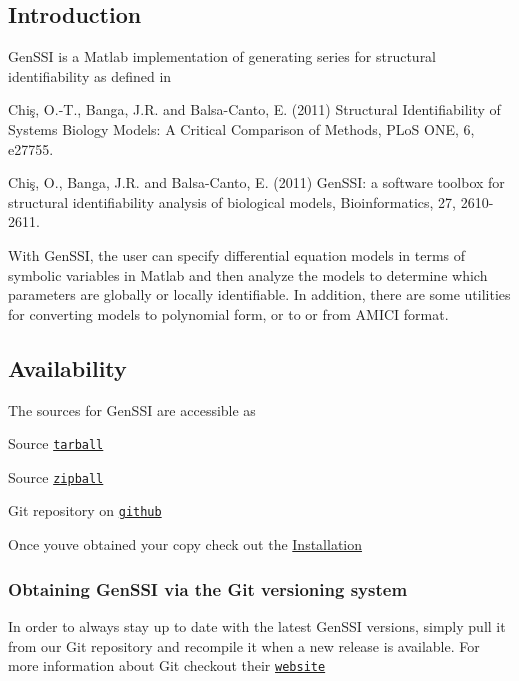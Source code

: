 \hypertarget{index_intro}{}\subsection{Introduction}\label{index_intro}
Gen\+S\+SI is a Matlab implementation of generating series for structural identifiability as defined in


\begin{DoxyItemize}
\item Chiş, O.-\/T., Banga, J.\+R. and Balsa-\/\+Canto, E. (2011) Structural Identifiability of Systems Biology Models\+: A Critical Comparison of Methods, P\+LoS O\+NE, 6, e27755.
\item Chiş, O., Banga, J.\+R. and Balsa-\/\+Canto, E. (2011) Gen\+S\+SI\+: a software toolbox for structural identifiability analysis of biological models, Bioinformatics, 27, 2610-\/2611.
\end{DoxyItemize}

With Gen\+S\+SI, the user can specify differential equation models in terms of symbolic variables in Matlab and then analyze the models to determine which parameters are globally or locally identifiable. In addition, there are some utilities for converting models to polynomial form, or to or from A\+M\+I\+CI format.\hypertarget{index_download}{}\subsection{Availability}\label{index_download}
The sources for Gen\+S\+SI are accessible as
\begin{DoxyItemize}
\item Source \href{https://github.com/thomassligon/GenSSI/tarball/master}{\tt tarball}
\item Source \href{https://github.com/thomassligon/GenSSI/zipball/master}{\tt zipball}
\item Git repository on \href{https://github.com/thomassligon/GenSSI}{\tt github}
\end{DoxyItemize}

Once you\textquotesingle{}ve obtained your copy check out the \hyperlink{index_install}{Installation}\hypertarget{index_git}{}\subsubsection{Obtaining Gen\+S\+S\+I via the Git versioning system}\label{index_git}
In order to always stay up to date with the latest Gen\+S\+SI versions, simply pull it from our Git repository and recompile it when a new release is available. For more information about Git checkout their \href{http://git-scm.com/}{\tt website}

